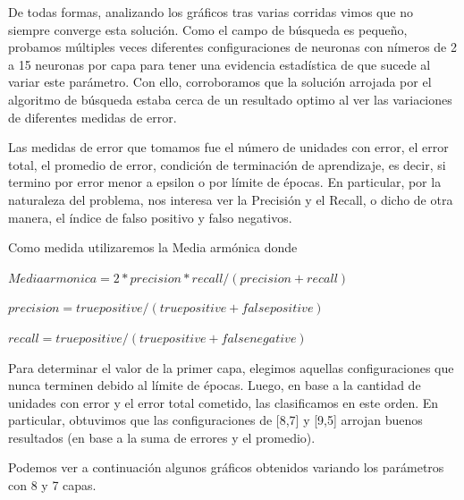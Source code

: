 De todas formas, analizando los gráficos tras varias corridas vimos que no siempre converge esta solución.
Como el campo de búsqueda es pequeño, probamos múltiples veces diferentes configuraciones de neuronas con nímeros de 2 a 15 neuronas por capa para tener una evidencia estadística de que sucede al variar este parámetro. Con ello, corroboramos que la solución arrojada por el algoritmo de búsqueda estaba cerca de un resultado optimo al ver las variaciones de diferentes medidas de error. 

Las medidas de error que tomamos fue el número de unidades con error, el error total, el promedio de error, condición de terminación de aprendizaje, es decir, si termino por error menor a epsilon o por límite de épocas. En particular, por la naturaleza del problema, nos interesa ver la Precisión y el Recall, o dicho de otra manera, el índice de falso positivo y falso negativos. 

Como medida utilizaremos la Media armónica donde 

$Media armonica=2*precision*recall/(precision+recall)$

$precision=true positive/(true positive+false positive)$

$recall= true positive/(true positive+false negative)$


Para determinar el valor de la primer capa, elegimos aquellas configuraciones que nunca terminen debido al límite de épocas. Luego, en base a la cantidad de unidades con error y el error total cometido, las clasificamos en este orden. 
En particular, obtuvimos que las configuraciones de [8,7] y [9,5] arrojan buenos resultados (en base a la suma de errores y el promedio).

Podemos ver a continuación algunos gráficos obtenidos variando los parámetros con 8 y 7 capas.

